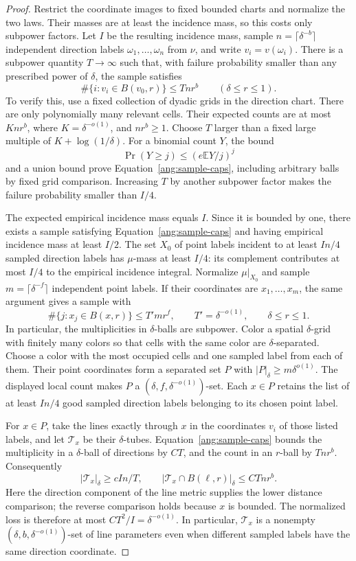\begin{proof}
Restrict the coordinate images to fixed bounded charts and normalize the
two laws. Their masses are at least the incidence mass, so this costs only
subpower factors. Let $I$ be the resulting incidence mass, sample
$n=\lceil\delta^{-b}\rceil$ independent direction labels
$\omega_1,\ldots,\omega_n$ from $\nu$, and write $v_i=v(\omega_i)$.
There is a subpower quantity $T\to\infty$ such that, with failure
probability smaller than any prescribed power of $\delta$, the sample
satisfies
\begin{equation}\label{ang:sample-caps}
 \#\{i:v_i\in B(v_0,r)\}\le Tnr^b
       \qquad(\delta\le r\le1).
\end{equation}
To verify this, use a fixed collection of dyadic grids in the direction
chart. There are only polynomially many relevant cells. Their expected
counts are at most $Knr^b$, where $K=\delta^{-o(1)}$, and
$nr^b\ge1$. Choose $T$ larger than a fixed large multiple of
$K+\log(1/\delta)$. For a binomial count $Y$, the bound
\[
 \Pr(Y\ge j)\le (e\mathbb E Y/j)^j
\]
and a union bound prove Equation~\eqref{ang:sample-caps}, including
arbitrary balls by fixed grid comparison. Increasing $T$ by another
subpower factor makes the failure probability smaller than $I/4$.

The expected empirical incidence mass equals $I$. Since it is bounded
by one, there exists a sample satisfying Equation~\eqref{ang:sample-caps}
and having empirical incidence mass at least $I/2$. The set $X_0$ of
point labels incident to at least $In/4$ sampled direction labels has
$\mu$-mass at least $I/4$: its complement contributes at most $I/4$
to the empirical incidence integral. Normalize $\mu|_{X_0}$ and sample
$m=\lceil\delta^{-f}\rceil$ independent point labels. If their coordinates
are $x_1,\ldots,x_m$, the same argument gives a sample with
\[
 \#\{j:x_j\in B(x,r)\}\le T'mr^f,
 \qquad T'=\delta^{-o(1)},\qquad \delta\le r\le1.
\]
In particular, the multiplicities in $\delta$-balls are subpower.
Color a spatial $\delta$-grid with finitely many colors so that cells
with the same color are $\delta$-separated. Choose a color with the most
occupied cells and one sampled label from each of them. Their
point coordinates form a separated set $P$ with
$|P|_\delta\ge m\delta^{o(1)}$. The displayed local count makes $P$
a $(\delta,f,\delta^{-o(1)})$-set. Each $x\in P$ retains the list of at
least $In/4$ good sampled direction labels belonging to its chosen point
label.

For $x\in P$, take the lines exactly through $x$ in the coordinates
$v_i$ of those listed labels, and let $\mathcal T_x$ be their
$\delta$-tubes. Equation~\eqref{ang:sample-caps} bounds the multiplicity
in a $\delta$-ball of directions by $CT$, and the count in an $r$-ball
by $Tnr^b$. Consequently
\[
 |\mathcal T_x|_\delta\ge cIn/T,
 \qquad
 |\mathcal T_x\cap B(\ell,r)|_\delta\le CTnr^b.
\]
Here the direction component of the line metric supplies the lower
distance comparison; the reverse comparison holds because $x$ is bounded.
The normalized loss is therefore at most $CT^2/I=\delta^{-o(1)}$.
In particular, $\mathcal T_x$ is a nonempty
$(\delta,b,\delta^{-o(1)})$-set of line parameters even when different
sampled labels have the same direction coordinate.


\end{proof}
